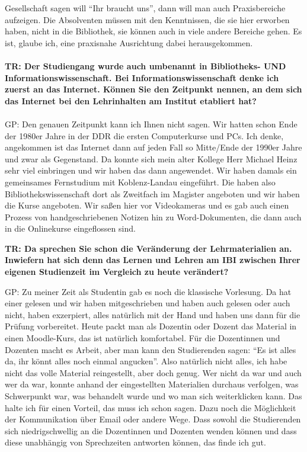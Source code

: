 \documentclass[a4paper,
fontsize=11pt,
oneside,
numbers=noperiodatend,
parskip=half-,
bibliography=totoc,
final
]{scrartcl}
\begin{document}
Gesellschaft sagen will \enquote{Ihr braucht uns}, dann will man auch
Praxisbereiche aufzeigen. Die Absolventen müssen mit den Kenntnissen,
die sie hier erworben haben, nicht in die Bibliothek, sie können auch in
viele andere Bereiche gehen. Es ist, glaube ich, eine praxisnahe
Ausrichtung dabei herausgekommen.\\
~\\
\textbf{TR: Der Studiengang wurde auch umbenannt in Bibliotheks- UND
Informationswissenschaft. Bei Informationswissenschaft denke ich zuerst
an das Internet. Können Sie den Zeitpunkt nennen, an dem sich das
Internet bei den Lehrinhalten am Institut etabliert hat?\\
}~\\
GP: Den genauen Zeitpunkt kann ich Ihnen nicht sagen. Wir hatten schon
Ende der 1980er Jahre in der DDR die ersten Computerkurse und PCs. Ich
denke, angekommen ist das Internet dann auf jeden Fall so Mitte/Ende der
1990er Jahre und zwar als Gegenstand. Da konnte sich mein alter Kollege
Herr Michael Heinz sehr viel einbringen und wir haben das dann
angewendet. Wir haben damals ein gemeinsames Fernstudium mit
Koblenz-Landau eingeführt. Die haben also Bibliothekswissenschaft dort
als Zweitfach im Magister angeboten und wir haben die Kurse angeboten.
Wir saßen hier vor Videokameras und es gab auch einen Prozess von
handgeschriebenen Notizen hin zu Word-Dokumenten, die dann auch in die
Onlinekurse eingeflossen sind.

\textbf{TR: Da sprechen Sie schon die Veränderung der Lehrmaterialien
an. Inwiefern hat sich denn das Lernen und Lehren am IBI zwischen Ihrer
eigenen Studienzeit im Vergleich zu heute verändert? }

GP: Zu meiner Zeit als Studentin gab es noch die klassische Vorlesung.
Da hat einer gelesen und wir haben mitgeschrieben und haben auch gelesen
oder auch nicht, haben exzerpiert, alles natürlich mit der Hand und
haben uns dann für die Prüfung vorbereitet. Heute packt man als Dozentin
oder Dozent das Material in einen Moodle-Kurs, das ist natürlich
komfortabel. Für die Dozentinnen und Dozenten macht es Arbeit, aber man
kann den Studierenden sagen: \enquote{Es ist alles da, ihr könnt alles
noch einmal angucken}. Also natürlich nicht alles, ich habe nicht das
volle Material reingestellt, aber doch genug. Wer nicht da war und auch
wer da war, konnte anhand der eingestellten Materialien durchaus
verfolgen, was Schwerpunkt war, was behandelt wurde und wo man sich
weiterklicken kann. Das halte ich für einen Vorteil, das muss ich schon
sagen. Dazu noch die Möglichkeit der Kommunikation über Email oder
andere Wege. Dass sowohl die Studierenden sich niedrigschwellig an die
Dozentinnen und Dozenten wenden können und dass diese unabhängig von
Sprechzeiten antworten können, das finde ich gut.
\end{document}

